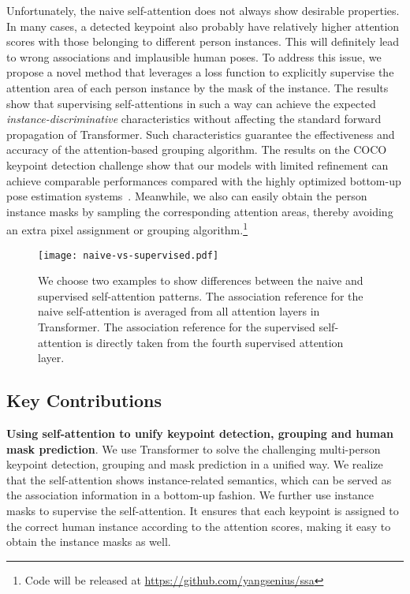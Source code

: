 \documentclass{article} \usepackage{iclr_conference,times}
\begin{document}
Unfortunately, the naive self-attention does not always show desirable properties. 
In many cases, a detected keypoint also probably have relatively higher attention scores with those belonging to different person instances. This will definitely lead to wrong associations and implausible human poses. 
To address this issue, we propose a novel method that leverages a loss function to explicitly supervise the attention area of each person instance by the mask of the instance.
The results show that supervising self-attentions in such a way can achieve the expected \textit{instance-discriminative} characteristics without affecting the standard forward propagation of Transformer. Such characteristics guarantee the effectiveness and accuracy of the attention-based grouping algorithm. The results on the COCO keypoint detection challenge show that our models with limited refinement can achieve comparable performances compared with the highly optimized bottom-up pose estimation systems~\citep{openpose:cao2017realtime, ae:newell2016associative, personlab:papandreou2018personlab}. Meanwhile, we also can easily obtain the person instance masks by sampling the corresponding attention areas, thereby avoiding an extra pixel assignment or grouping algorithm.\footnote{Code will be released at \url{https://github.com/yangsenius/ssa}}

\begin{figure}
    \centering
    \texttt{[image: naive-vs-supervised.pdf]}
    \caption{We choose two examples to show differences between the naive and supervised self-attention patterns. The association reference for the naive self-attention is averaged from all attention layers in Transformer. The association reference for the supervised self-attention is directly taken from the fourth supervised attention layer.} 
    \label{fig:navie-vs-supervised}\vspace{-1em}
\end{figure}

\subsection{Key Contributions}

\textbf{Using self-attention to unify keypoint detection, grouping and human mask prediction}. We use Transformer to solve the challenging multi-person keypoint detection, grouping and mask prediction in a unified way. We realize that the self-attention shows instance-related semantics, which can be served as the association information in a bottom-up fashion. We further use instance masks to supervise the self-attention. It ensures that each keypoint is assigned to the correct human instance according to the attention scores, making it easy to obtain the instance masks as well. 
\end{document}
